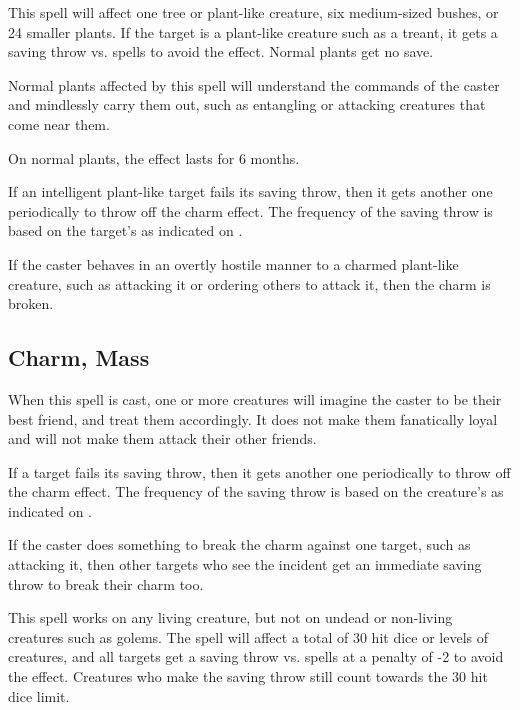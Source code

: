 \begin{multicols*}{2}
This spell will affect one tree or plant-like creature, six medium-sized bushes, or 24 smaller plants. If the target is a plant-like creature such as a treant, it gets a saving throw vs. spells to avoid the effect. Normal plants get no save.

Normal plants affected by this spell will understand the commands of the caster and mindlessly carry them out, such as entangling or attacking creatures that come near them.

On normal plants, the effect lasts for 6 months.

If an intelligent plant-like target fails its saving throw, then it gets another one periodically to throw off the charm effect. The frequency of the saving throw is based on the target’s  as indicated on .

If the caster behaves in an overtly hostile manner to a charmed plant-like creature, such as attacking it or ordering others to attack it, then the charm is broken.

\subsection{Charm, Mass}\label{spell:Charm, Mass}

When this spell is cast, one or more creatures will imagine the caster to be their best friend, and treat them accordingly. It does not make them fanatically loyal and will not make them attack their other friends.

If a target fails its saving throw, then it gets another one periodically to throw off the charm effect. The frequency of the saving throw is based on the creature’s  as indicated on .

If the caster does something to break the charm against one target, such as attacking it, then other targets who see the incident get an immediate saving throw to break their charm too.

This spell works on any living creature, but not on undead or non-living creatures such as golems. The spell will affect a total of 30 hit dice or levels of creatures, and all targets get a saving throw vs. spells at a penalty of -2 to avoid the effect. Creatures who make the saving throw still count towards the 30 hit dice limit.


\end{multicols*}
